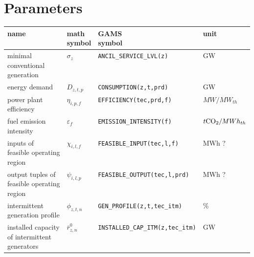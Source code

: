 \documentclass[11pt,a4paper]{article}
\begin{document}
\section{Parameters} \label{parameters}
\begin{tabular}{l l l l}
\textbf{name} & \makecell[l]{\textbf{math} \\ \textbf{symbol}} & \makecell[l]{\textbf{GAMS} \\\textbf{symbol}} & \textbf{unit} \\
\hline \hline
\makecell[l]{minimal \\conventional \\generation} & $\sigma_{z}$ & \texttt{ANCIL\_SERVICE\_LVL(z)} & GW \\ \hline
energy demand & $D_{z,t,p}$ & \texttt{CONSUMPTION(z,t,prd)} & GW \\ \hline
\makecell[l]{power plant \\efficiency} & $\eta_{i,p,f}$ & \texttt{EFFICIENCY(tec,prd,f)} & $MW / MW_{th}$\\ \hline
\makecell[l]{fuel emission \\intensity} & $\varepsilon_{f}$ & \texttt{EMISSION\_INTENSITY(f)} & $t \ce{CO2}/MWh_{th}$\\ \hline
\makecell[l]{inputs of \\feasible operating \\region} & $\chi_{i,l,f}$ & \texttt{FEASIBLE\_INPUT(tec,l,f)} & MWh ? \\ \hline
\makecell[l]{output tuples of \\feasible operating \\region} & $\psi_{i,l,p}$ & \texttt{FEASIBLE\_OUTPUT(tec,l,prd)} & MWh ? \\ \hline
\makecell[l]{intermittent \\generation profile} & $\phi_{z,t,n}$ & \texttt{GEN\_PROFILE(z,t,tec\_itm)} & \% \\ \hline
\makecell[l]{installed capacity \\of intermittent \\generators} & $\bar{r}^{0}_{z,n}$ & \texttt{INSTALLED\_CAP\_ITM(z,tec\_itm)} & GW \\ \hline

\end{tabular}
\end{document}
